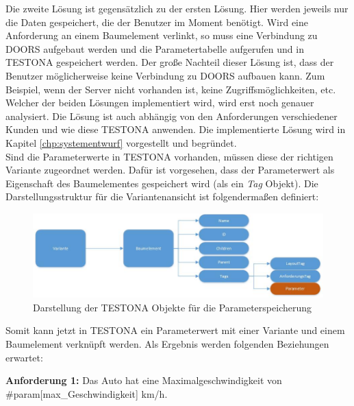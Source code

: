 Die zweite Lösung ist gegensätzlich zu der ersten Lösung. Hier werden jeweils nur die Daten gespeichert, die der Benutzer im Moment benötigt. Wird eine Anforderung an einem Baumelement verlinkt, so muss eine Verbindung zu DOORS aufgebaut werden und die Parametertabelle aufgerufen und in TESTONA gespeichert werden. Der große Nachteil dieser Lösung ist, dass der Benutzer möglicherweise keine Verbindung zu DOORS aufbauen kann. Zum Beispiel, wenn der Server nicht vorhanden ist, keine Zugriffsmöglichkeiten, etc. Welcher der beiden Lösungen implementiert wird, wird erst noch genauer analysiert. Die Lösung ist auch abhängig von den Anforderungen verschiedener Kunden und wie diese TESTONA anwenden. Die implementierte Lösung wird in Kapitel \ref{chp:systementwurf} vorgestellt und begründet.\\


Sind die Parameterwerte in TESTONA vorhanden, müssen diese der richtigen Variante zugeordnet werden. Dafür ist vorgesehen, dass der Parameterwert als Eigenschaft des Baumelementes gespeichert wird (als ein \textit{Tag} Objekt). Die Darstellungsstruktur für die Variantenansicht ist folgendermaßen definiert:\\

\begin{figure}[h!]
  \begin{center}
    \includegraphics[scale=0.5]{4_1_UML_Var_TreeItem_Properties.jpg}
  		  \caption{Darstellung der TESTONA Objekte für die Parameterspeicherung}
     \label{ttn.objectGraph}
  \end{center}
\end{figure}


Somit kann jetzt in TESTONA ein Parameterwert mit einer Variante und einem Baumelement verknüpft werden. Als Ergebnis werden folgenden Beziehungen erwartet:

\begin{center}
\textbf{Anforderung 1: }Das Auto hat eine Maximalgeschwindigkeit von \#param[max\_Geschwindigkeit] km/h.
\end{center}

